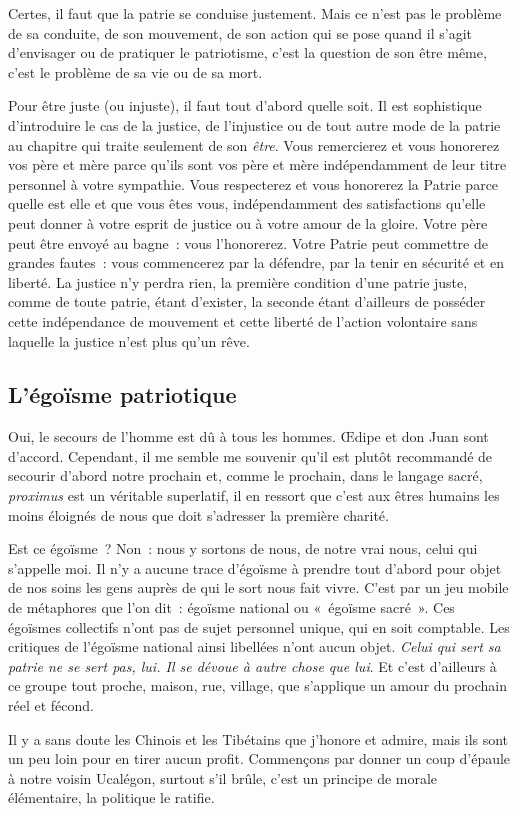 \documentclass[french,twoside]{book} %
\newcommand{\astermono}{\medskip\centerline{\color{rubric}\large\selectfont{\syms ✻}}\medskip\par}%
\begin{document}
\astermono

\noindent Certes, il faut que la patrie se conduise justement. Mais ce n’est pas le problème de sa conduite, de son mouvement, de son action qui se pose quand il s’agit d’envisager ou de pratiquer le patriotisme, c’est la question de son être même, c’est le problème de sa vie ou de sa mort.\par
Pour être juste (ou injuste), il faut tout d’abord quelle soit. Il est sophistique d’introduire le cas de la justice, de l’injustice ou de tout autre mode de la patrie au chapitre qui traite seulement de son \emph{être}. Vous remercierez et vous honorerez vos père et mère parce qu’ils sont vos père et mère indépendamment de leur titre personnel à votre sympathie. Vous respecterez et vous honorerez la Patrie parce quelle est elle et que vous êtes vous, indépendamment des satisfactions qu’elle peut donner à votre esprit de justice ou à votre amour de la gloire. Votre père peut être envoyé au bagne : vous l’honorerez. Votre Patrie peut commettre de grandes fautes : vous commencerez par la défendre, par la tenir en sécurité et en liberté. La justice n’y perdra rien, la première condition d’une patrie juste, comme de toute patrie, étant d’exister, la seconde étant d’ailleurs de posséder cette indépendance de mouvement et cette liberté de l’action volontaire sans laquelle la justice n’est plus qu’un rêve.\par

\astermono

\subsection[L’égoïsme patriotique]{L’égoïsme patriotique}
\noindent Oui, le secours de l’homme est dû à tous les hommes. Œdipe et don Juan sont d’accord. Cependant, il me semble me souvenir qu’il est plutôt recommandé de secourir d’abord notre prochain et, comme le prochain, dans le langage sacré, \emph{proximus} est un véritable superlatif, il en ressort que c’est aux êtres humains les moins éloignés de nous que doit s’adresser la première charité.\par
Est ce égoïsme ? Non : nous y sortons de nous, de notre vrai nous, celui qui s’appelle moi. Il n’y a aucune trace d’égoïsme à prendre tout d’abord pour objet de nos soins les gens auprès de qui le sort nous fait vivre. C’est par un jeu mobile de métaphores que l’on dit : égoïsme national ou « égoïsme sacré ». Ces égoïsmes collectifs n’ont pas de sujet personnel unique, qui en soit comptable. Les critiques de l’égoïsme national ainsi libellées n’ont aucun objet. \emph{Celui qui sert sa patrie ne se sert pas, lui. Il se dévoue à autre chose que lui}. Et c’est d’ailleurs à ce groupe tout proche, maison, rue, village, que s’applique un amour du prochain réel et fécond.\par
Il y a sans doute les Chinois et les Tibétains que j’honore et admire, mais ils sont un peu loin pour en tirer aucun profit. Commençons par donner un coup d’épaule à notre voisin Ucalégon, surtout s’il brûle, c’est un principe de morale élémentaire, la politique le ratifie.
\end{document}
